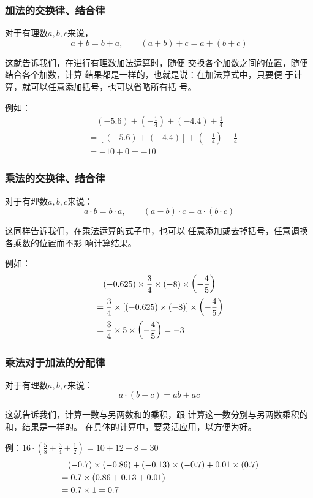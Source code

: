 \subsubsection{加法的交换律、结合律}
\begin{blk}{}
对于有理数$a,b,c$来说，
\[a+b=b+a,\qquad (a+b)+c=a+(b+c)\]
\end{blk}

这就告诉我们，在进行有理数加法运算时，随便
交换各个加数之间的位置，随便结合各个加数，计算
结果都是一样的，也就是说：在加法算式中，只要便
于计算，就可以任意添加括号，也可以省略所有括
号。

例如：
\[\begin{split}
&\quad (-5.6)+\left(-\frac{1}{4}\right)+(-4.4)+\frac{1}{4}\\
&=[(-5.6)+(-4.4)]+\left(-\frac{1}{4}\right)+\frac{1}{4}\\
&=-10+0=-10
\end{split}\]

\subsubsection{乘法的交换律、结合律}
\begin{blk}{}
    对于有理数$a, b, c$来说：
   \[ a\cdot b=b\cdot a,\qquad   (a-b)\cdot c=a\cdot  (b\cdot  c)\]
\end{blk}


   这同样告诉我们，在乘法运算的式子中，也可以
任意添加或去掉括号，任意调换各乘数的位置而不影
响计算结果。

例如：\[\begin{split}
   &\quad  (-0.625)\times\dfrac{3}{4}\times(-8)\times\left(-\dfrac{4}{5}\right)\\
    &=\dfrac{3}{4}\times[(-0.625)\times(-8)]\times\left(-\dfrac{4}{5}\right)\\
    &=\dfrac{3}{4}\times5\times\left(-\dfrac{4}{5}\right)=-3
\end{split}\]


\subsubsection{乘法对于加法的分配律}
\begin{blk}{}
对于有理数$a,  b,  c$来说：
\[ a\cdot (b+c)=ab+ac\]
\end{blk}

这就告诉我们，计算一数与另两数和的乘积，跟
计算这一数分别与另两数乘积的和，结果是一样的。
在具体的计算中，要灵活应用，以方便为好。

例：$16\cdot \left(\frac{5}{8}+\frac{3}{4}+\frac{1}{2}\right)=10+12+8=30$
\[\begin{split}
   &\quad (-0.7)\times (-0.86)+(-0.13)\times (-0.7)+0.01\times (0.7)\\
    &=0.7\times (0.86+0.13+0.01)\\
    &=0.7\times 1=0.7
\end{split}\]

